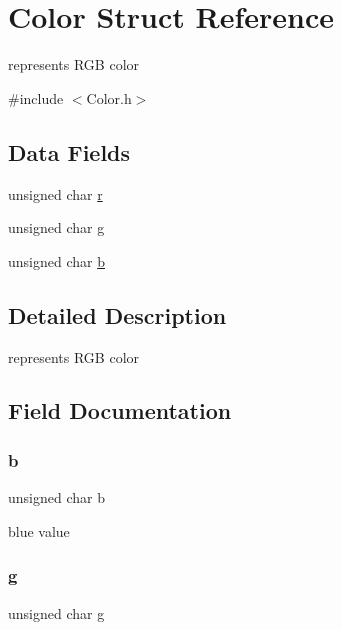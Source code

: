 \hypertarget{struct_color}{}\section{Color Struct Reference}
\label{struct_color}


represents R\+GB color  




{\ttfamily \#include $<$Color.\+h$>$}

\subsection*{Data Fields}
\begin{DoxyCompactItemize}
\item 
unsigned char \hyperlink{struct_color_afd7b1ea9ff115205b65e0bffc92946ac}{r}
\item 
unsigned char \hyperlink{struct_color_a83576af39a9f289a28c1263d61073508}{g}
\item 
unsigned char \hyperlink{struct_color_a41cede1b4c0d05cff170ad5761f70964}{b}
\end{DoxyCompactItemize}


\subsection{Detailed Description}
represents R\+GB color 

\subsection{Field Documentation}
\mbox{\label{struct_color_a41cede1b4c0d05cff170ad5761f70964}} 
\subsubsection{\texorpdfstring{b}{b}}
{\footnotesize\ttfamily unsigned char b}

blue value \mbox{\label{struct_color_a83576af39a9f289a28c1263d61073508}} 
\subsubsection{\texorpdfstring{g}{g}}
{\footnotesize\ttfamily unsigned char g}


